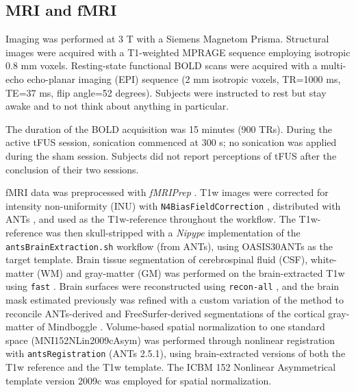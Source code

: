 \documentclass[conference]{ieeeconf}
\begin{document}
\subsection*{MRI and fMRI}
Imaging was performed at 3 T with a Siemens Magnetom Prisma. Structural images were acquired with a T1-weighted MPRAGE sequence employing isotropic 0.8 mm voxels. Resting-state functional BOLD scans were acquired with a multi-echo echo-planar imaging (EPI) sequence (2 mm isotropic voxels, TR=1000 ms, TE=37 ms, flip angle=52 degrees). Subjects were instructed to rest but stay awake and to not think about anything in particular.

The duration of the BOLD acquisition was 15 minutes (900 TRs). During the active tFUS session, sonication commenced at 300 s; no sonication was applied during the sham session. Subjects did not report perceptions of tFUS after the conclusion of their two sessions. 

fMRI data was preprocessed with \emph{fMRIPrep} \cite{fmriprep1,fmriprep2,nipype1,nipype2}. T1w images were corrected for intensity non-uniformity (INU)
with \texttt{N4BiasFieldCorrection} \cite{n4}, distributed with ANTs \cite{ants}, and used as the T1w-reference
throughout the workflow. The T1w-reference was then skull-stripped with
a \emph{Nipype} implementation of the \texttt{antsBrainExtraction.sh}
workflow (from ANTs), using OASIS30ANTs as the target template. Brain tissue
segmentation of cerebrospinal fluid (CSF), white-matter (WM) and
gray-matter (GM) was performed on the brain-extracted T1w using
\texttt{fast} \cite{fsl_fast}. Brain
surfaces were reconstructed using \texttt{recon-all} \cite{fs_reconall}, and the brain mask estimated
previously was refined with a custom variation of the method to
reconcile ANTs-derived and FreeSurfer-derived segmentations of the
cortical gray-matter of Mindboggle
\cite{mindboggle}. Volume-based spatial
normalization to one standard space (MNI152NLin2009cAsym) was performed
through nonlinear registration with \texttt{antsRegistration} (ANTs
2.5.1), using brain-extracted versions of both the T1w reference and the T1w
template. The ICBM 152 Nonlinear Asymmetrical
template version 2009c \cite{mni152nlin2009casym} was employed for spatial
normalization.
\end{document}
